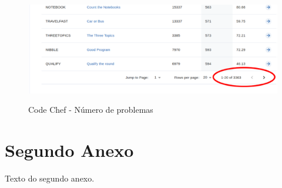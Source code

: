 \begin{anexosenv}
\begin{figure}[H]
    \centering
    \caption{Code Chef - Número de problemas}
    \includegraphics[keepaspectratio=true,scale=0.3]{figuras/code_chef_2.eps}
    \label{fig:code_chef_2}
\end{figure}

\chapter{Segundo Anexo}

    Texto do segundo anexo.

\end{anexosenv}

